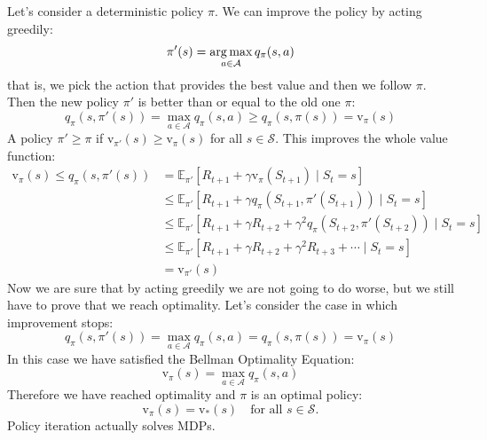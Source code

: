 \begin{theorem}
    Let's consider a deterministic policy $\pi$. We can improve the policy by acting greedily:
    \[\pi'(s)=\operatorname*{arg\,max}_{a\in\mathcal{A}}q_\pi(s,a)\]
    that is, we pick the action that provides the best value and then we follow $\pi$. Then the new policy $\pi'$ is better than or equal to the old one $\pi$:
    \[q_\pi(s,\pi'(s))=\max_{a\in\mathcal{A}}q_\pi(s,a)\geq q_\pi(s,\pi(s))=\mathrm{v}_\pi(s)\]
    A policy $\pi'\geq\pi$ if $\mathrm{v}_{\pi'}(s)\geq\mathrm{v}_\pi(s)$ for all $s\in\mathcal{S}$. This improves the whole value function:
    \begin{equation}
      \begin{split}
        \mathrm{v}_\pi(s)\leq q_\pi(s,\pi'(s))&=\mathbb{E}_{\pi'}[R_{t+1}+\gamma \mathrm{v}_\pi(S_{t+1})\mid S_t=s]\\
        &\leq \mathbb{E}_{\pi'}[R_{t+1}+\gamma q_\pi(S_{t+1},\pi'(S_{t+1}))\mid S_t=s]\\
        &\leq \mathbb{E}_{\pi'}[R_{t+1}+\gamma R_{t+2}+\gamma^2q_\pi(S_{t+2},\pi'(S_{t+2}))\mid S_t=s]\\
        &\leq \mathbb{E}_{\pi'}[R_{t+1}+\gamma R_{t+2}+\gamma^2R_{t+3}+\cdots\mid S_t=s]\\
        &=\mathrm{v}_{\pi'}(s)
      \end{split}
    \end{equation}
    Now we are sure that by acting greedily we are not going to do worse, but we still have to prove that we reach optimality. Let's consider the case in which improvement stops:
    \[q_\pi(s,\pi'(s))=\max_{a\in\mathcal{A}}q_\pi(s,a)=q_\pi(s,\pi(s))=\mathrm{v}_\pi(s)\]
    In this case we have satisfied the Bellman Optimality Equation:
    \[\mathrm{v}_\pi(s)=\max_{a\in\mathcal{A}}q_\pi(s,a)\]
    Therefore we have reached optimality and $\pi$ is an optimal policy:
    \[\mathrm{v}_\pi(s)=\mathrm{v}_*(s)\quad\text{for all } s\in\mathcal{S}.\]
    Policy iteration actually solves MDPs.
\end{theorem}

